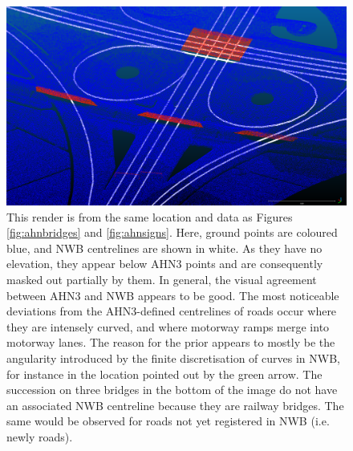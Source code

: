 \begin{figure}[h]
    \centering
    \includegraphics[width=\linewidth]{p2/figs/ahn_sample_04.png} 
    \caption{This render is from the same location and data as Figures \ref{fig:ahnbridges} and \ref{fig:ahnsigns}. Here, ground points are coloured blue, and NWB centrelines are shown in white. As they have no elevation, they appear below AHN3 points and are consequently masked out partially by them. In general, the visual agreement between AHN3 and NWB appears to be good. The most noticeable deviations from the AHN3-defined centrelines of roads occur where they are intensely curved, and where motorway ramps merge into motorway lanes. The reason for the prior appears to mostly be the angularity introduced by the finite discretisation of curves in NWB, for instance in the location pointed out by the green arrow. The succession on three bridges in the bottom of the image do not have an associated NWB centreline because they are railway bridges. The same would be observed for roads not yet registered in NWB (i.e. newly roads).}
    \label{fig:ahnnwb}
\end{figure}

